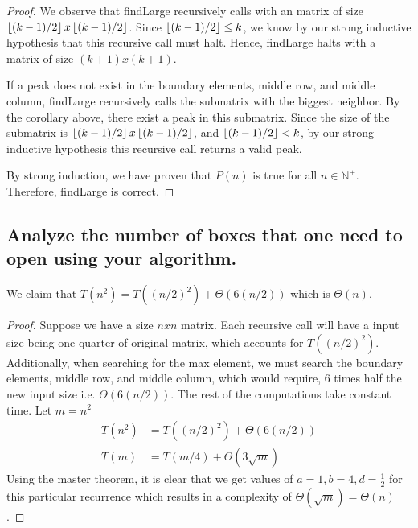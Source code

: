 \documentclass[11pt]{scrartcl}
\begin{document}
\begin{proof}
	\par We observe that findLarge recursively calls with an matrix of size
	$\left\lfloor (k-1) / 2 \right\rfloor x \left\lfloor (k-1) / 2 \right\rfloor$.
	Since $\left\lfloor (k-1) / 2 \right\rfloor \leq k$, we know by our strong inductive hypothesis that this
	recursive call must halt. Hence, findLarge halts with a matrix of size $(k+1)x(k+1)$.

	\par If a peak does not exist in the boundary elements, middle row, and middle column, findLarge
	recursively calls the submatrix with the biggest neighbor. By the corollary above, there
	exist a peak in this submatrix. Since the size of the submatrix is $\left\lfloor (k-1) / 2 \right\rfloor x \left\lfloor (k-1) / 2 \right\rfloor$,
	and $\left\lfloor (k-1) / 2 \right\rfloor < k$, by our strong inductive hypothesis this recursive call returns a valid peak.

	\par By strong induction, we have proven that $P(n)$ is true for all $n \in \mathbb{N^{+}}$.
	Therefore, findLarge is correct.
\end{proof}

\subsection{
	Analyze the number of boxes that one need to open using your algorithm.
}
We claim that $T(n^2) = T((n/2)^2) + \Theta(6(n/2))$ which is $\Theta(n)$.
\begin{proof}
	Suppose we have a size $nxn$ matrix. Each recursive call will have a input size being one quarter
	of original matrix, which accounts for $T((n/2)^2)$. Additionally, when searching for the max element,
	we must search the boundary elements, middle row, and middle column, which would require, 6 times half the new input size
	i.e. $\Theta(6(n/2))$.
	The rest of the computations take constant time. Let $m = n^2$
	\begin{align*}
		T(n^2) & = T((n/2)^2) + \Theta(6(n/2)) \\
		T(m)   & = T(m/4) + \Theta(3\sqrt{m})
	\end{align*}
	Using the master theorem, it is clear that we get values of $a = 1, b = 4, d = \frac12$ for this particular
	recurrence which results in a complexity of $\Theta(\sqrt{m}) = \Theta(n)$.
\end{proof}
\iffalse
	Suppose we have a $nxn$ matrix.
	A call to our algorithm will result in single recursive call
	with its input sized being halfed. Additionally, for each
	recursive call, we must search the boundary elements, middle row, and middle column,
	which would require, 6 times half the input size time.
	\begin{align*}
		T(n^2) & = T(\frac{n}{2}x\frac{n}{2}) + \Theta(6(\frac{n}{2})) \\
		T(n)   & = T(\frac{n}{4}) + \Theta(3\sqrt{n})
	\end{align*}
\fi
\end{document}
